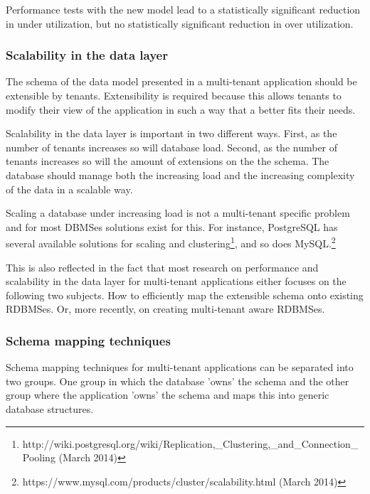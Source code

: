 Performance tests with the new model lead to a statistically significant reduction in under utilization, but no statistically significant reduction in over utilization.


\subsubsection{Scalability in the data layer}
The schema of the data model presented in a multi-tenant application should be extensible by tenants.
Extensibility is required because this allows tenants to modify their view of the application in such a way that a better fits their needs.

Scalability in the data layer is important in two different ways.
First, as the number of tenants increases so will database load.
Second, as the number of tenants increases so will the amount of extensions on the the schema. 
The database should manage both the increasing load and the increasing complexity of the data in a scalable way.

Scaling a database under increasing load is not a multi-tenant specific problem and for most DBMSes solutions exist for this. 
For instance, PostgreSQL has several available solutions for scaling and clustering\footnote{http://wiki.postgresql.org/wiki/Replication,\_Clustering,\_and\_Connection\_Pooling (March 2014)}, and so does MySQL.\footnote{https://www.mysql.com/products/cluster/scalability.html (March 2014)}

This is also reflected in the fact that most research on performance and scalability in the data layer for multi-tenant applications either focuses on the following two subjects.
How to efficiently map the extensible schema onto existing RDBMSes.\cite{aulbach2008multi, aulbach2009comparison} 
Or, more recently, on creating multi-tenant aware RDBMSes.\cite{schiller2011native, aulbach2011extensibility} 

\subsubsection{Schema mapping techniques}
Schema mapping techniques for multi-tenant applications can be separated into two groups. 
One group in which the database 'owns' the schema  and the other group where the application 'owns' the schema and maps this into generic database structures.\cite{aulbach2009comparison}

